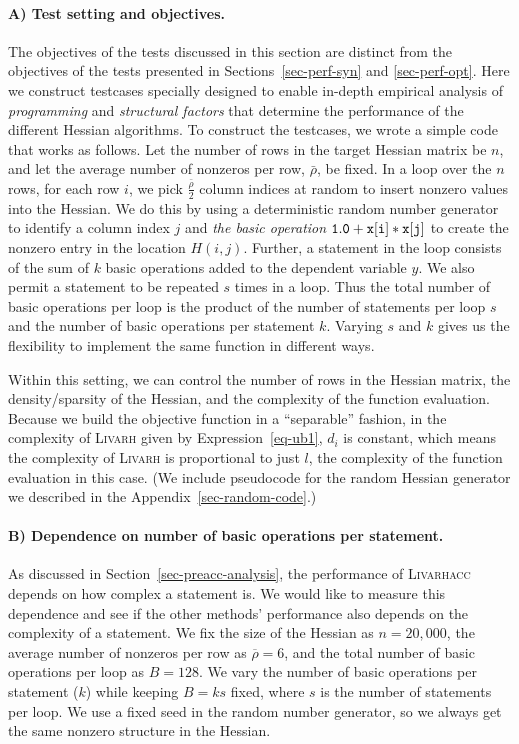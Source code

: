 \documentclass[11pt, twocolumn]{article}
\begin{document}
\paragraph{A) Test setting and objectives.}
The objectives of the tests discussed in this section are distinct from
the objectives of the tests presented in Sections~\ref{sec-perf-syn} and \ref{sec-perf-opt}.
Here we construct testcases specially designed to enable in-depth
empirical analysis of {\em programming} and {\em structural factors} that 
determine the performance of the  different Hessian algorithms. 
To construct the testcases, we wrote a simple code that works as follows. 
Let the number of rows in the target Hessian matrix be $n$, and
let the average number of nonzeros per row, $\bar{\rho}$, be fixed.
In a loop over the $n$ rows, for each row $i$, 
we pick $\frac{\bar{\rho}}{2}$ column indices at random to insert nonzero values into the Hessian.    
We do this by using a deterministic random number generator to identify a column index $j$ and {\em the basic operation} 
$\tt 1.0+x[i]*x[j]$ to create the nonzero entry in the location $H(i,j)$. 
Further, a statement in the loop consists of the sum of $k$ basic operations added to the dependent variable $y$. We also permit a statement to be repeated $s$ times in a loop. Thus the total number of basic operations per loop is the product of the number of statements per loop $s$ and the number of basic operations per statement $k$. Varying $s$ and $k$ gives us the flexibility to implement the same function in different ways.

Within this setting, we can control the number of rows in the Hessian matrix, the density/sparsity of the Hessian, and the complexity of the function evaluation. Because we build
the objective function in a ``separable'' fashion, in the complexity of 
\textsc{Livarh} given by Expression~\eqref{eq-ub1}, $d_i$ is constant, which means the complexity of \textsc{Livarh} is proportional to just $l$, the complexity of the function 
evaluation in this case.
(We include pseudocode for the random Hessian generator we described in the Appendix~\ref{sec-random-code}.)   


\paragraph{B) Dependence on number of basic operations per statement.}

As discussed in Section~\ref{sec-preacc-analysis}, the performance of \textsc{Livarhacc} depends on how complex a statement is. We would like to measure this dependence
and see if the other methods' performance also depends on the complexity of a statement. We fix the size of the Hessian as $n=20,000$, the average number of nonzeros per row as $\overline{\rho} = 6$, and the total number of basic operations per loop as $B=128$.
We vary the number of basic operations per statement ($k$) while keeping $B=k s$ fixed, where $s$ is the number of statements per loop. We use a fixed seed in the random number generator,
so we always get the same nonzero structure in the Hessian. 
\end{document}
